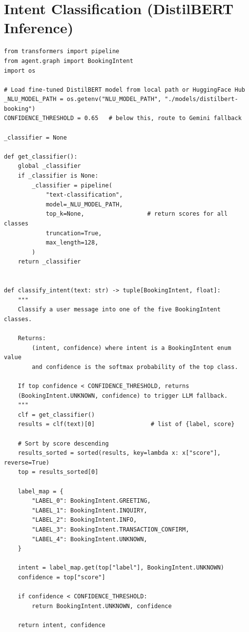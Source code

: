 \section{Intent Classification (DistilBERT Inference)}
\label{app:code-nlu}

\begin{lstlisting}[style=pythonstyle, caption={Intent classification using fine-tuned DistilBERT (agent/nlu.py).}]
from transformers import pipeline
from agent.graph import BookingIntent
import os

# Load fine-tuned DistilBERT model from local path or HuggingFace Hub
_NLU_MODEL_PATH = os.getenv("NLU_MODEL_PATH", "./models/distilbert-booking")
CONFIDENCE_THRESHOLD = 0.65   # below this, route to Gemini fallback

_classifier = None

def get_classifier():
    global _classifier
    if _classifier is None:
        _classifier = pipeline(
            "text-classification",
            model=_NLU_MODEL_PATH,
            top_k=None,                  # return scores for all classes
            truncation=True,
            max_length=128,
        )
    return _classifier


def classify_intent(text: str) -> tuple[BookingIntent, float]:
    """
    Classify a user message into one of the five BookingIntent classes.

    Returns:
        (intent, confidence) where intent is a BookingIntent enum value
        and confidence is the softmax probability of the top class.

    If top confidence < CONFIDENCE_THRESHOLD, returns
    (BookingIntent.UNKNOWN, confidence) to trigger LLM fallback.
    """
    clf = get_classifier()
    results = clf(text)[0]                # list of {label, score}

    # Sort by score descending
    results_sorted = sorted(results, key=lambda x: x["score"], reverse=True)
    top = results_sorted[0]

    label_map = {
        "LABEL_0": BookingIntent.GREETING,
        "LABEL_1": BookingIntent.INQUIRY,
        "LABEL_2": BookingIntent.INFO,
        "LABEL_3": BookingIntent.TRANSACTION_CONFIRM,
        "LABEL_4": BookingIntent.UNKNOWN,
    }

    intent = label_map.get(top["label"], BookingIntent.UNKNOWN)
    confidence = top["score"]

    if confidence < CONFIDENCE_THRESHOLD:
        return BookingIntent.UNKNOWN, confidence

    return intent, confidence
\end{lstlisting}

